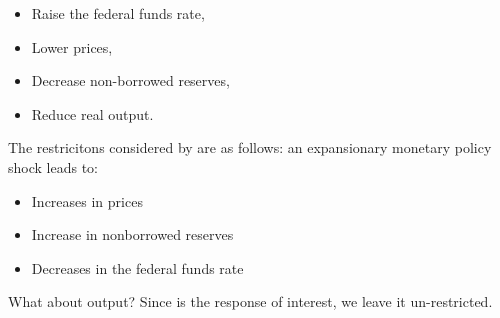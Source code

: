 \documentclass[
  12pt,
]{book}
\providecommand{\tightlist}{%
  \setlength{\itemsep}{0pt}\setlength{\parskip}{0pt}}
\theoremstyle{definition}
\theoremstyle{definition}
\theoremstyle{definition}
\theoremstyle{definition}
\theoremstyle{remark}
\begin{document}
\begin{itemize}
\tightlist
\item
  Raise the federal funds rate,
\item
  Lower prices,
\item
  Decrease non-borrowed reserves,
\item
  Reduce real output.
\end{itemize}

The restricitons considered by \citet{Uhlig_2005} are as follows: an expansionary monetary policy shock leads to:

\begin{itemize}
\tightlist
\item
  Increases in prices
\item
  Increase in nonborrowed reserves
\item
  Decreases in the federal funds rate
\end{itemize}

What about output? Since is the response of interest, we leave it un-restricted.
\end{document}
